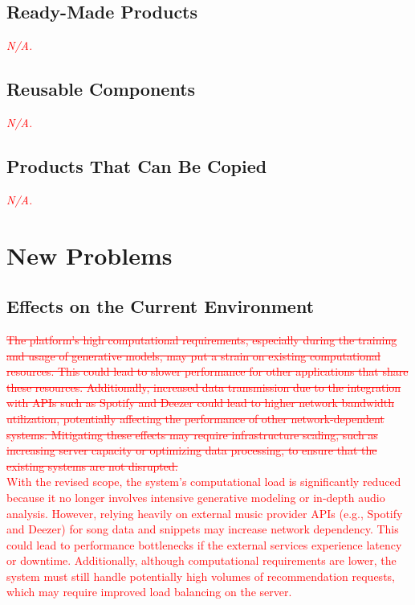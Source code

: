 \documentclass[12pt]{article}
\begin{document}
\subsection{Ready-Made Products}
\textcolor{red}{\emph{N/A.}}
\subsection{Reusable Components}
\textcolor{red}{\emph{N/A.}}
\subsection{Products That Can Be Copied}
\textcolor{red}{\emph{N/A.}}

\section{New Problems}

\subsection{Effects on the Current Environment}

\textcolor{red}{\sout{The platform's high computational requirements, especially during the training and usage of generative models, may put a strain on existing 
computational resources. This could lead to slower performance for other applications that share these resources. Additionally, increased data 
transmission due to the integration with APIs such as Spotify and Deezer could lead to higher network bandwidth utilization, potentially affecting 
the performance of other network-dependent systems. Mitigating these effects may require infrastructure scaling, such as increasing server capacity 
or optimizing data processing, to ensure that the existing systems are not disrupted.}}\\

\noindent\textcolor{red}{With the revised scope, the system’s computational load is significantly reduced because it no longer involves intensive generative modeling or 
in-depth audio analysis. However, relying heavily on external music provider APIs (e.g., Spotify and Deezer) for song data and snippets may increase 
network dependency. This could lead to performance bottlenecks if the external services experience latency or downtime. Additionally, although computational 
requirements are lower, the system must still handle potentially high volumes of recommendation requests, which may require improved load balancing on the server.}
\end{document}
